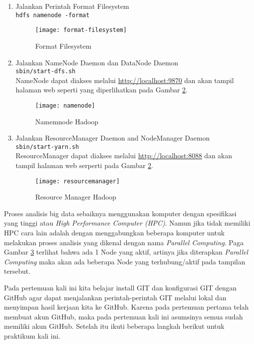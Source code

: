 \documentclass[a4paper]{tufte-handout}
\begin{document}
\begin{enumerate}
\item Jalankan Perintah Format Filesystem \\
{\tt hdfs namenode -format}
\begin{figure}[!ht]
\texttt{[image: format-filesystem]}
\caption{Format Filesystem}
\label{gam:format-filesystem}
\end{figure}

\item Jalankan NameNode Daemon dan DataNode Daemon \\
{\tt sbin/start-dfs.sh} \\
NameNode dapat diakses melalui \url{http://localhost:9870} dan akan tampil halaman web seperti yang diperlihatkan pada Gambar \ref{gam:namenode}.
\begin{figure}[!ht]
\texttt{[image: namenode]}
\caption{Namemnode Hadoop}
\label{gam:namenode}
\end{figure}

\item Jalankan ResourceManager Daemon and NodeManager Daemon \\
{\tt sbin/start-yarn.sh} \\
ResourceManager dapat diakses melalui \url{http://localhost:8088} dan akan tampil halaman web serperti pada Gambar \ref{gam:namenode}.
\begin{figure}[!ht]
\texttt{[image: resourcemanager]}
\caption{Resource Manager Hadoop}
\label{gam:resourcemanager}
\end{figure}
\end{enumerate}

Proses analisis big data sebaiknya menggunakan komputer dengan spesifikasi yang tinggi atau \textit{High Performance Computer (HPC)}. Namun jika tidak memiliki HPC cara lain adalah dengan menggabungkan beberapa komputer untuk melakukan proses analisis yang dikenal dengan nama \textit{Parallel Computing}. Paga Gambar \ref{gam:resourcemanager} terlihat bahwa ada 1 Node yang aktif, artinya jika diterapkan \textit{Parallel Computing} maka akan ada beberapa Node yang terhubung/aktif pada tampilan tersebut.

\hrulefill

\clearpage
{}


Pada pertemuan kali ini kita belajar install GIT dan konfigurasi GIT dengan GitHub agar dapat menjalankan perintah-perintah GIT melalui lokal dan menyimpan hasil kerjaan kita ke GitHub. Karena pada pertemuan pertama telah membuat akun GitHub, maka pada pertemuan kali ini asumsinya semua sudah memiliki akun GitHub. Setelah itu ikuti beberapa langkah berikut untuk praktikum kali ini.
\end{document}
